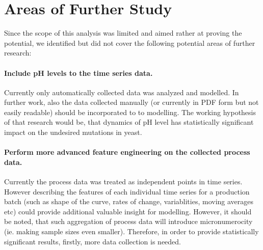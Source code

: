 \documentclass{article}
\begin{document}






\section{Areas of Further Study}
Since the scope of this analysis was limited and aimed rather at proving the potential, we identified but did not cover the following potential areas of further research:

\paragraph{Include pH levels to the time series data.} Currently only automatically collected data was analyzed and modelled. In further work, also the data collected manually (or currently in PDF form but not easily readable) should be incorporated to to modelling. The working hypothesis of that research would be, that dynamics of pH level has statistically significant impact on the undesired mutations in yeast.
\paragraph{Perform more advanced feature engineering on the collected process data.} Currently the process data was treated as independent points in time series. However describing the features of each individual time series for a production batch (such as shape of the curve, rates of change, variablities, moving averages etc) could provide additional valuable insight for modelling. However, it should be noted, that such aggregation of process data will introduce micronumerocity (ie. making sample sizes even smaller). Therefore, in order to provide statistically significant results, firstly, more data collection is needed.

\appendix

\end{document}
